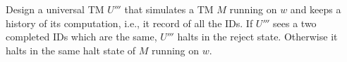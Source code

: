   Design a universal TM $U'''$ that simulates a TM $M$ running on $w$
  and keeps a history of its computation, i.e., it record of all the IDs.
  If $U'''$ sees a two completed IDs which are the same,
  $U'''$ halts in the reject state.
  Otherwise it halts in the same halt state of $M$ running on $w$.
